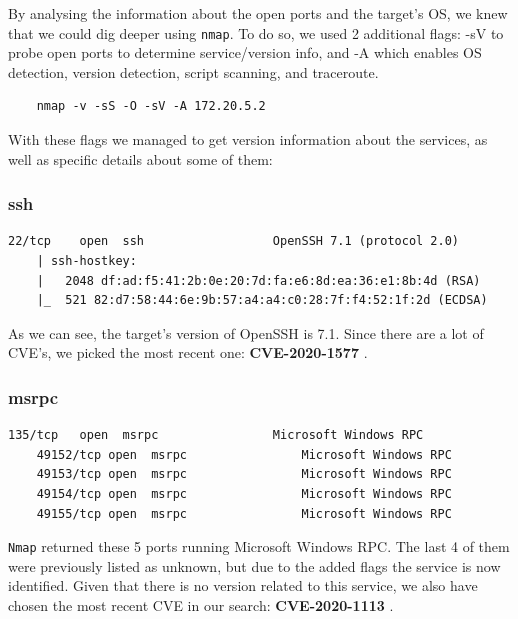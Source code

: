 By analysing the information about the open ports and the target's OS, we knew that we could dig deeper using \texttt{nmap}. To do so, we used 2 additional flags: -sV to probe open ports to determine service/version info, and -A which enables OS detection, version detection, script scanning, and traceroute.

\begin{lstlisting}
    nmap -v -sS -O -sV -A 172.20.5.2
\end{lstlisting}

With these flags we managed to get version information about the services, as well as specific details about some of them:

\subsubsection{ssh}

\begin{lstlisting}[basicstyle=\scriptsize]
    22/tcp    open  ssh                  OpenSSH 7.1 (protocol 2.0)
    | ssh-hostkey: 
    |   2048 df:ad:f5:41:2b:0e:20:7d:fa:e6:8d:ea:36:e1:8b:4d (RSA)
    |_  521 82:d7:58:44:6e:9b:57:a4:a4:c0:28:7f:f4:52:1f:2d (ECDSA)
\end{lstlisting}

As we can see, the target's version of OpenSSH is 7.1. Since there are a lot of CVE's, we picked the most recent one: \textbf{CVE-2020-1577} \cite{cve1}.

\subsubsection{msrpc}

\begin{lstlisting}[basicstyle=\scriptsize]
    135/tcp   open  msrpc                Microsoft Windows RPC
    49152/tcp open  msrpc                Microsoft Windows RPC
    49153/tcp open  msrpc                Microsoft Windows RPC
    49154/tcp open  msrpc                Microsoft Windows RPC
    49155/tcp open  msrpc                Microsoft Windows RPC
\end{lstlisting}

\texttt{Nmap} returned these 5 ports running Microsoft  Windows RPC. The last 4 of them were previously listed as unknown, but due to the added flags the service is now identified. Given that there is no version related to this service, we also have chosen the most recent CVE in our search: \textbf{CVE-2020-1113} \cite{cve2}.

